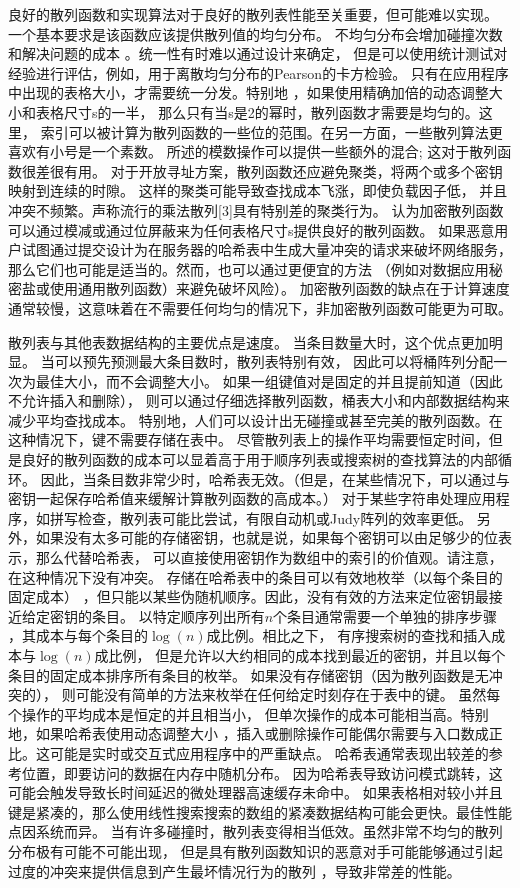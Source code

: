 良好的散列函数和实现算法对于良好的散列表性能至关重要，但可能难以实现。
一个基本要求是该函数应该提供散列值的均匀分布。
不均匀分布会增加碰撞次数和解决问题的成本
。统一性有时难以通过设计来确定，
但是可以使用统计测试对经验进行评估，例如，用于离散均匀分布的Pearson的卡方检验。
只有在应用程序中出现的表格大小，才需要统一分发。特别地
，如果使用精确加倍的动态调整大小和表格尺寸s的一半，
那么只有当s是2的幂时，散列函数才需要是均匀的。这里，
索引可以被计算为散列函数的一些位的范围。在另一方面，一些散列算法更喜欢有小号是一个素数。
所述的模数操作可以提供一些额外的混合; 这对于散列函数很差很有用。
对于开放寻址方案，散列函数还应避免聚类，将两个或多个密钥映射到连续的时隙。
这样的聚类可能导致查找成本飞涨，即使负载因子低，
并且冲突不频繁。声称流行的乘法散列[3]具有特别差的聚类行为。
认为加密散列函数可以通过模减或通过位屏蔽来为任何表格尺寸s提供良好的散列函数。
如果恶意用户试图通过提交设计为在服务器的哈希表中生成大量冲突的请求来破坏网络服务，
那么它们也可能是适当的。然而，也可以通过更便宜的方法
（例如对数据应用秘密盐或使用通用散列函数）来避免破坏风险）。
加密散列函数的缺点在于计算速度通常较慢，这意味着在不需要任何均匀的情况下，非加密散列函数可能更为可取。

散列表与其他表数据结构的主要优点是速度。
当条目数量大时，这个优点更加明显。
当可以预先预测最大条目数时，散列表特别有效，
因此可以将桶阵列分配一次为最佳大小，而不会调整大小。
如果一组键值对是固定的并且提前知道（因此不允许插入和删除），
则可以通过仔细选择散列函数，桶表大小和内部数据结构来减少平均查找成本。
特别地，人们可以设计出无碰撞或甚至完美的散列函数。在这种情况下，键不需要存储在表中。
尽管散列表上的操作平均需要恒定时间，但是良好的散列函数的成本可以显着高于用于顺序列表或搜索树的查找算法的内部循环。
因此，当条目数非常少时，哈希表无效。（但是，在某些情况下，可以通过与密钥一起保存哈希值来缓解计算散列函数的高成本。）
对于某些字符串处理应用程序，如拼写检查，散列表可能比尝试，有限自动机或Judy阵列的效率更低。
另外，如果没有太多可能的存储密钥，也就是说，如果每个密钥可以由足够少的位表示，那么代替哈希表，
可以直接使用密钥作为数组中的索引的价值观。请注意，在这种情况下没有冲突。
存储在哈希表中的条目可以有效地枚举（以每个条目的固定成本）
，但只能以某些伪随机顺序。因此，没有有效的方法来定位密钥最接近给定密钥的条目。
以特定顺序列出所有$ n $个条目通常需要一个单独的排序步骤
，其成本与每个条目的$ \log \left( n\right) $成比例。相比之下，
有序搜索树的查找和插入成本与$ \log \left( n\right) $成比例，
但是允许以大约相同的成本找到最近的密钥，并且以每个条目的固定成本排序所有条目的枚举。
如果没有存储密钥（因为散列函数是无冲突的），
则可能没有简单的方法来枚举在任何给定时刻存在于表中的键。
虽然每个操作的平均成本是恒定的并且相当小，
但单次操作的成本可能相当高。特别地，如果哈希表使用动态调整大小
，插入或删除操作可能偶尔需要与入口数成正比。这可能是实时或交互式应用程序中的严重缺点。
哈希表通常表现出较差的参考位置，即要访问的数据在内存中随机分布。
因为哈希表导致访问模式跳转，这可能会触发导致长时间延迟的微处理器高速缓存未命中。
如果表格相对较小并且键是紧凑的，那么使用线性搜索搜索的数组的紧凑数据结构可能会更快。最佳性能点因系统而异。
当有许多碰撞时，散列表变得相当低效。虽然非常不均匀的散列分布极有可能不可能出现，
但是具有散列函数知识的恶意对手可能能够通过引起过度的冲突来提供信息到产生最坏情况行为的散列
，导致非常差的性能。

